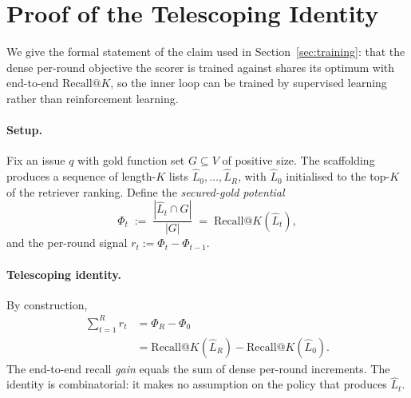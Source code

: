 
\section{Proof of the Telescoping Identity}
\label{app:proof}

We give the formal statement of the claim used in
Section~\ref{sec:training}: that the dense per-round objective
the scorer is trained against shares its optimum with
end-to-end $\text{Recall}@K$, so the inner loop can be trained
by supervised learning rather than reinforcement learning.

\paragraph{Setup.}
Fix an issue $q$ with gold function set $G \subseteq V$ of
positive size. The scaffolding produces a sequence of length-$K$
lists $\hat{L}_0, \dots, \hat{L}_R$, with $\hat{L}_0$ initialised
to the top-$K$ of the retriever ranking. Define the
\emph{secured-gold potential}
\begin{equation}
  \Phi_t \;:=\; \frac{|\hat{L}_t \cap G|}{|G|}
  \;=\; \text{Recall}@K(\hat{L}_t),
  \label{eq:potential}
\end{equation}
and the per-round signal $r_t := \Phi_t - \Phi_{t-1}$.

\paragraph{Telescoping identity.}
By construction,
\begin{equation}
\begin{aligned}
  \sum_{t=1}^{R} r_t
  &= \Phi_R - \Phi_0 \\
  &= \text{Recall}@K(\hat{L}_R)
    - \text{Recall}@K(\hat{L}_0).
\end{aligned}
  \label{eq:telescope}
\end{equation}
The end-to-end recall \emph{gain} equals the sum of dense
per-round increments. The identity is combinatorial: it makes
no assumption on the policy that produces $\hat{L}_t$.

